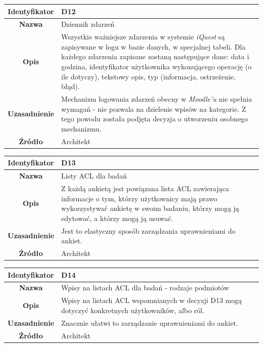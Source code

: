 \begin{table}[H]
\centering
\begin{tabular}{ | >{\bfseries}c | p{11cm} | }
\hline
%
Identyfikator & D12 \\ \hline
Nazwa & Dziennik zdarzeń \\ \hline
Opis & Wszystkie ważniejsze zdarzenia w systemie \textit{iQuest} są zapisywane w logu w bazie danych, w specjalnej tabeli. Dla każdego zdarzenia zapisane zostaną następujące dane: data i godzina, identyfikator użytkownika wykonującego operację (o ile dotyczy), tekstowy opis, typ (informacja, ostrzeżenie, błąd). \\ \hline
Uzasadnienie & Mechanizm logowania zdarzeń obecny w \textit{Moodle'u} nie spełnia wymagań - nie pozwala na dzielenie wpisów na kategorie. Z tego powodu została podjęta decyzja o utworzeniu osobnego mechanizmu. \\ \hline
Źródło & Architekt \\ \hline
%
\end{tabular}
\end{table}

\begin{table}[H]
\centering
\begin{tabular}{ | >{\bfseries}c | p{11cm} | }
\hline
%
Identyfikator & D13 \\ \hline
Nazwa & Listy ACL dla badań \\ \hline
Opis & Z każdą ankietą jest powiązana lista ACL zawierająca informacje o tym, którzy użytkownicy mają prawo wykorzystywać ankietę w swoim badaniu, którzy mogą ją edytować, a którzy mogą ją usuwać. \\ \hline
Uzasadnienie & Jest to elastyczny sposób zarządzania uprawnieniami do ankiet. \\ \hline
Źródło & Architekt \\ \hline
%
\end{tabular}
\end{table}

\begin{table}[H]
\centering
\begin{tabular}{ | >{\bfseries}c | p{11cm} | }
\hline
%
Identyfikator & D14 \\ \hline
Nazwa & Wpisy na listach ACL dla badań - rodzaje podmiotów \\ \hline
Opis & Wpisy na listach ACL wspomnianych w decyzji D13 mogą dotyczyć konkretnych użytkowników, albo ról. \\ \hline
Uzasadnienie & Znacznie ułatwi to zarządzanie uprawnieniami do ankiet. \\ \hline
Źródło & Architekt \\ \hline
%
\end{tabular}
\end{table}

